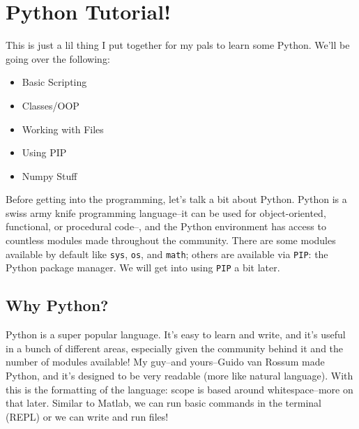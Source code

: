 \documentclass[11pt, twoside, reqno]{book}
\begin{document}
\startmain
\chapter{Python Tutorial!}

This is just a lil thing I put together for my pals to learn some Python. We'll be going over the following:
\begin{itemize} \item Basic Scripting\end{itemize}
\begin{itemize} \item Classes/OOP\end{itemize}
\begin{itemize} \item Working with Files\end{itemize}
\begin{itemize} \item Using PIP\end{itemize}
\begin{itemize} \item Numpy Stuff\end{itemize}

Before getting into the programming, let's talk a bit about Python. Python is a swiss army knife programming language--it can be used for object-oriented, functional, or procedural code--, and the Python environment has access to countless modules made throughout the community. There are some modules available by default like \texttt{sys}, \texttt{os}, and \texttt{math}; others are available via \texttt{PIP}: the Python package manager. We will get into using \texttt{PIP} a bit later.

\section{Why Python?}

Python is a super popular language. It's easy to learn and write, and it's useful in a bunch of different areas, especially given the community behind it and the number of modules available! My guy--and yours--Guido van Rossum made Python, and it's designed to be very readable (more like natural language). With this is the formatting of the language: scope is based around whitespace--more on that later. Similar to Matlab, we can run basic commands in the terminal (REPL) or we can write and run files!
\end{document}
